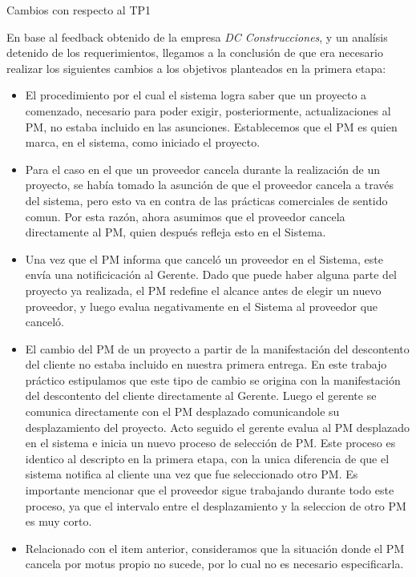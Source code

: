 Cambios con respecto al TP1

En base al feedback obtenido de la empresa \textit{DC Construcciones}, y un analísis detenido de los requerimientos, llegamos a la conclusión de que era necesario realizar los siguientes cambios a los objetivos planteados en la primera etapa:

\begin{itemize}
  \item El procedimiento por el cual el sistema logra saber que un proyecto a comenzado, necesario para poder exigir, posteriormente, actualizaciones al PM, no estaba incluido en las asunciones. Establecemos que el PM es quien marca, en el sistema, como iniciado el proyecto.
  \item Para el caso en el que un proveedor cancela durante la realización de un proyecto, se había tomado la asunción de que el proveedor cancela a través del sistema, pero esto va en contra de las prácticas comerciales de sentido comun. Por esta razón, ahora asumimos que el proveedor cancela directamente al PM, quien después refleja esto en el Sistema.
  \item Una vez que el PM informa que canceló un proveedor en el Sistema, este envía una notificicación al Gerente. Dado que puede haber alguna parte del proyecto ya realizada, el PM redefine el alcance antes de elegir un nuevo proveedor, y luego evalua negativamente en el Sistema al proveedor que canceló.
  \item El cambio del PM de un proyecto a partir de la manifestación del descontento del cliente no estaba incluido en nuestra primera entrega. En este trabajo práctico estipulamos que este tipo de cambio se origina con la manifestación del descontento del cliente directamente al Gerente. Luego el gerente se comunica directamente con el PM desplazado comunicandole su desplazamiento del proyecto. Acto seguido el gerente evalua al PM desplazado en el sistema e inicia un nuevo proceso de selección de PM. Este proceso es identico al descripto en la primera etapa, con la unica diferencia de que el sistema notifica al cliente una vez que fue seleccionado otro PM. Es importante mencionar que el proveedor sigue trabajando durante todo este proceso, ya que el intervalo entre el desplazamiento y la seleccion de otro PM es muy corto.
  \item Relacionado con el item anterior, consideramos que la situación donde el PM cancela por motus propio no sucede, por lo cual no es necesario especificarla.  
\end{itemize}

